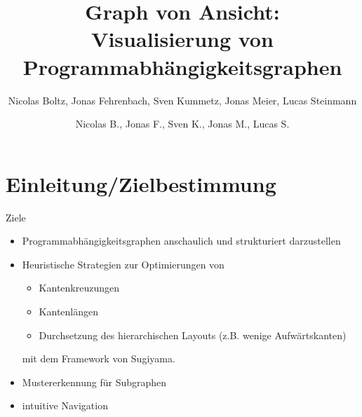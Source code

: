 \documentclass[18pt]{beamer}
\title[Graph von Ansicht]{Graph von Ansicht:\\ Visualisierung von Programmabhängigkeitsgraphen}
\subtitle{}
\author{Nicolas Boltz, Jonas Fehrenbach, Sven Kummetz, Jonas Meier, Lucas Steinmann}
\institute{}
\begin{document}

\begin{frame}
\titlepage
\end{frame}

\author{Nicolas B., Jonas F., Sven K., Jonas M., Lucas S.}

\section{Einleitung/Zielbestimmung}
\begin{frame}{Ziele}
  \begin{itemize}
    \item Programmabhängigkeitsgraphen anschaulich und strukturiert darzustellen
    \pause
    \pause
    \pause
    \item Heuristische Strategien zur Optimierungen von
      \begin{itemize}
        \item Kantenkreuzungen
        \item Kantenlängen
        \item Durchsetzung des hierarchischen Layouts (z.B. wenige Aufwärtskanten)
      \end{itemize}
      mit dem Framework von Sugiyama.
    \pause
    \item Mustererkennung für Subgraphen
    \pause
    \item intuitive Navigation
  \end{itemize}
   {
  }
\end{frame}
\end{document}
